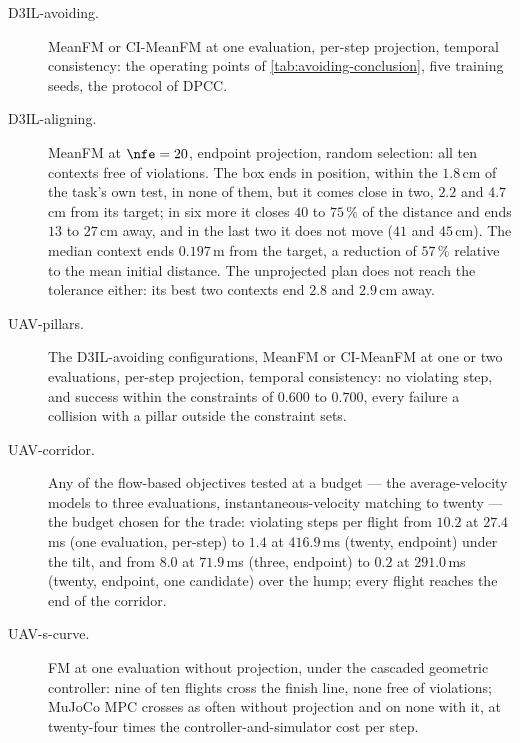 \begin{description}
  \item[D3IL-avoiding.] MeanFM or CI-MeanFM at one evaluation, per-step projection, temporal consistency:
    the operating points of \autoref{tab:avoiding-conclusion}, five training seeds, the protocol of \ac{DPCC}.
  \item[D3IL-aligning.] MeanFM at $\nfe=20$, endpoint projection, random selection: all ten contexts
    free of violations. The box ends in position, within the $1.8$\,cm of the task's own test, in none of
    them, but it comes close in two, $2.2$ and $4.7$\,cm from its target; in six more it closes $40$ to
    $75\,\%$ of the distance and ends $13$ to $27$\,cm away, and in the last two it does not move ($41$ and
    $45$\,cm). The median context ends $0.197$\,m from the target, a reduction of $57\,\%$ relative to the mean initial
    distance.
    The unprojected plan does not reach the tolerance either: its best two contexts end $2.8$ and $2.9$\,cm
    away.
  \item[UAV-pillars.] The D3IL-avoiding configurations, MeanFM or CI-MeanFM at one or two evaluations,
    per-step projection, temporal consistency: no violating step, and success within the constraints of
    $0.600$ to $0.700$, every failure a collision with a pillar outside the constraint sets.
  \item[UAV-corridor.] Any of the flow-based objectives tested at a budget --- the average-velocity models to
    three evaluations, instantaneous-velocity matching to twenty --- the budget chosen for the trade:
    violating steps per flight
    from $10.2$ at $27.4$\,ms (one evaluation, per-step) to $1.4$ at $416.9$\,ms (twenty, endpoint) under the
    tilt, and from $8.0$ at $71.9$\,ms (three, endpoint) to $0.2$ at $291.0$\,ms (twenty, endpoint, one
    candidate) over the hump; every flight reaches the end of the corridor.
  \item[UAV-s-curve.] FM at one evaluation without projection, under the cascaded geometric controller: nine
    of ten flights cross the finish line, none free of violations; MuJoCo MPC crosses as often without
    projection and on none with it, at twenty-four times the controller-and-simulator cost per step.
\end{description}
